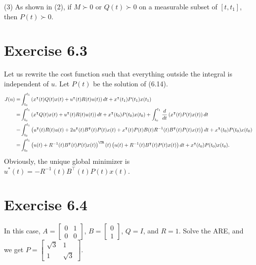 \documentclass[11pt]{report}
\newcommand{\T}{\intercal}
\begin{document}
(3) As shown in (2), if $M \succ 0$ or $Q(t) \succ 0$ on a measurable subset of $[t, t_1]$, then $P(t) \succ 0$.

\section*{Exercise 6.3}
Let us rewrite the cost function such that everything outside the integral is independent of $u$. Let $P(t)$ be the solution of (6.14).
\begin{align*}
J(u) = & \int_{t_0}^{t_1} \left(x^\T(t) Q(t) x(t) + u^\T(t) R(t) u(t)\right) d t + x^\T(t_1)P(t_1)x(t_1) \\ = & \int_{t_0}^{t_1} \left(x^\T Q(t) x(t) + u^\T(t) R(t) u(t)\right) d t + x^\T(t_0)P(t_0)x(t_0) + \int_{t_0}^{t_1} \frac{d}{dt}\left(x^\T(t)P(t)x(t)\right) dt \\ = & \int_{t_0}^{t_1} \left(u^\T(t) R(t) u(t) + 2u^\T(t)B^\T(t)P(t)x(t) + x^\T(t)P(t)B(t)R^{-1}(t)B^\T(t)P(t)x(t)\right) d t + x^\T(t_0)P(t_0)x(t_0) \\ = & \int_{t_0}^{t_1} \left(u(t) + R^{-1}(t)B^\T(t)P(t)x(t)\right)^\TR(t)\left(u(t) + R^{-1}(t)B^\T(t)P(t)x(t)\right) d t + x^\T(t_0)P(t_0)x(t_0).
\end{align*}
Obviously, the unique global minimizer is $u^*(t) = - R^{-1}(t)B^\T(t)P(t)x(t)$.

\section*{Exercise 6.4}
In this case, $A = \begin{bmatrix}0 & 1\\ 0 & 0\end{bmatrix}$, $B = \begin{bmatrix}0\\1\end{bmatrix}$, $Q = I$, and $R = 1$. Solve the ARE, and we get $P = \begin{bmatrix}\sqrt{3} & 1\\ 1 & \sqrt{3}\end{bmatrix}$.
\end{document}
